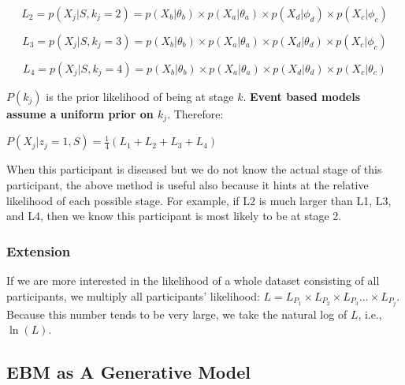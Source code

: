 \documentclass[
  letterpaper,
  DIV=11,
  numbers=noendperiod]{scrreprt}
\begin{document}
\[L_2 = p(X_j | S, k_j = 2) = p (X_b | \theta_b) \times p (X_a | \theta_a) \times p (X_d | \phi_d) \times p (X_c | \phi_c)\]

\[L_3 = p(X_j | S, k_j = 3) = p (X_b | \theta_b) \times p (X_a | \theta_a) \times p (X_d | \theta_d) \times p (X_c | \phi_c)\]

\[L_4 = p(X_j | S, k_j = 4) = p (X_b | \theta_b) \times p (X_a | \theta_a) \times p (X_d | \theta_d) \times p (X_c | \theta_c)\]

\(P(k_j)\) is the prior likelihood of being at stage \(k\).
\textbf{Event based models assume a uniform prior on \(k_j\)}.
Therefore:

\(P(X_{j} | z_j=1, S) = \frac{1}{4} \left(L_1 + L_2 + L_3 + L_4 \right)\)

\begin{tcolorbox}[enhanced jigsaw, breakable, bottomtitle=1mm, toprule=.15mm, colframe=quarto-callout-tip-color-frame, colbacktitle=quarto-callout-tip-color!10!white, arc=.35mm, bottomrule=.15mm, left=2mm, opacitybacktitle=0.6, toptitle=1mm, colback=white, opacityback=0, title=\textcolor{quarto-callout-tip-color}{\faLightbulb}\hspace{0.5em}{Tip}, titlerule=0mm, rightrule=.15mm, leftrule=.75mm, coltitle=black]

When this participant is diseased but we do not know the actual stage of
this participant, the above method is useful also because it hints at
the relative likelihood of each possible stage. For example, if L2 is
much larger than L1, L3, and L4, then we know this participant is most
likely to be at stage 2.

\end{tcolorbox}

\subsubsection{Extension}\label{extension}

If we are more interested in the likelihood of a whole dataset
consisting of all participants, we multiply all participants'
likelihood:
\(L = L_{P_1} \times L_{P_2} \times L_{P_3} ... \times L_{P_j}\).
Because this number tends to be very large, we take the natural log of
\(L\), i.e., \(\ln(L)\).

\subsection{EBM as A Generative Model}\label{sec-gen}
\end{document}
